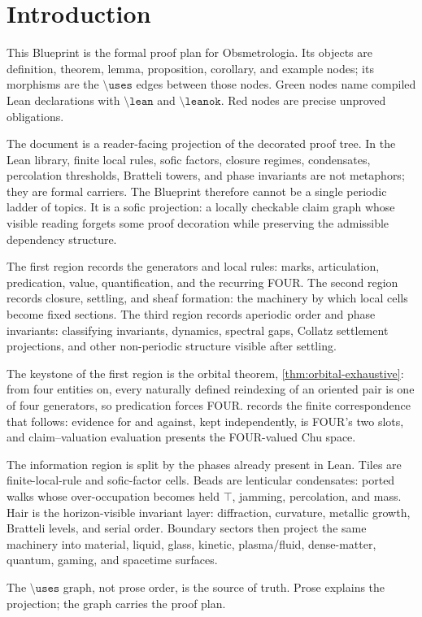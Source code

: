 \chapter{Introduction}
\label{ch:intro}

This Blueprint is the formal proof plan for Obsmetrologia.  Its objects are
definition, theorem, lemma, proposition, corollary, and example nodes; its
morphisms are the \(\texttt{\textbackslash uses}\) edges between those nodes.
Green nodes name compiled Lean declarations with \(\texttt{\textbackslash lean}\)
and \(\texttt{\textbackslash leanok}\).  Red nodes are precise unproved
obligations.

The document is a reader-facing projection of the decorated proof tree.  In the
Lean library, finite local rules, sofic factors, closure regimes, condensates,
percolation thresholds, Bratteli towers, and phase invariants are not metaphors;
they are formal carriers.  The Blueprint therefore cannot be a single periodic
ladder of topics.  It is a sofic projection: a locally checkable claim graph
whose visible reading forgets some proof decoration while preserving the
admissible dependency structure.

The first region records the generators and local rules: marks, articulation,
predication, value, quantification, and the recurring FOUR.  The second region
records closure, settling, and sheaf formation: the machinery by which local
cells become fixed sections.  The third region records aperiodic order and phase
invariants: classifying invariants, dynamics, spectral gaps, Collatz settlement
projections, and other non-periodic structure visible after settling.

The keystone of the first region is the orbital theorem,
\cref{thm:orbital-exhaustive}: from four entities on, every naturally defined
reindexing of an oriented pair is one of four generators, so predication forces FOUR.
 records the finite correspondence that follows:
evidence for and against, kept independently, is FOUR's two slots, and claim--valuation
evaluation presents the FOUR-valued Chu space.

The information region is split by the phases already present in Lean.
Tiles are finite-local-rule and sofic-factor cells.  Beads are lenticular
condensates: ported walks whose over-occupation becomes held
\(\top\), jamming, percolation, and mass.  Hair is the horizon-visible
invariant layer: diffraction, curvature, metallic growth, Bratteli levels, and
serial order.  Boundary sectors then project the same machinery into material,
liquid, glass, kinetic, plasma/fluid, dense-matter, quantum, gaming, and
spacetime surfaces.

The \(\texttt{\textbackslash uses}\) graph, not prose order, is the source of
truth.  Prose explains the projection; the graph carries the proof plan.
